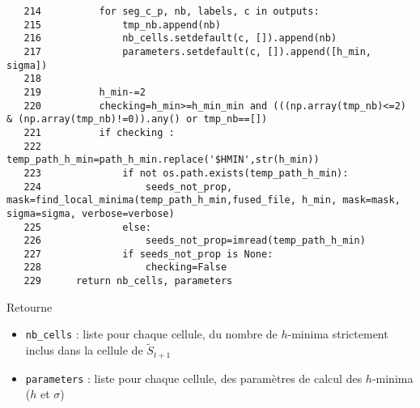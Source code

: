 \documentclass{article}
\def \mycolor {red}
\begin{document}
\color{black}
\begin{verbatim}  
   214	        for seg_c_p, nb, labels, c in outputs:
   215	            tmp_nb.append(nb)
   216	            nb_cells.setdefault(c, []).append(nb)
   217	            parameters.setdefault(c, []).append([h_min, sigma])
   218	
   219	        h_min-=2
   220	        checking=h_min>=h_min_min and (((np.array(tmp_nb)<=2) & (np.array(tmp_nb)!=0)).any() or tmp_nb==[])
   221	        if checking :
   222	            temp_path_h_min=path_h_min.replace('$HMIN',str(h_min))
   223	            if not os.path.exists(temp_path_h_min):
   224	                seeds_not_prop, mask=find_local_minima(temp_path_h_min,fused_file, h_min, mask=mask, sigma=sigma, verbose=verbose)
   225	            else:
   226	                seeds_not_prop=imread(temp_path_h_min)
   227	            if seeds_not_prop is None:
   228	                checking=False
   229	    return nb_cells, parameters
\end{verbatim}
\color{\mycolor}
Retourne
\begin{itemize}
\itemsep -1ex
\item \verb|nb_cells| : liste pour chaque cellule, du nombre de $h$-minima strictement inclus dans la cellule de  $\tilde{S}_{t+1}$
\item \verb|parameters| : liste pour chaque cellule,  des param\`etres de calcul des $h$-minima ($h$ et $\sigma$)
\end{itemize}
\color{black}
\end{document}
